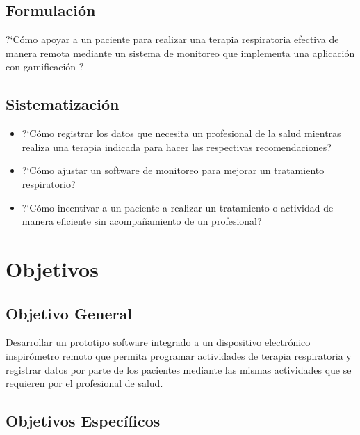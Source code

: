 \subsection{Formulaci\'on}

?`C\'omo apoyar a un paciente para realizar una terapia respiratoria efectiva de manera remota mediante un sistema de monitoreo que implementa una aplicaci\'on con gamificaci\'on ?

\subsection{Sistematizaci\'on}

\begin{itemize}

\item ?`C\'omo registrar los datos que necesita un profesional de la salud mientras realiza una terapia indicada para hacer las respectivas recomendaciones?

\item ?`C\'omo ajustar un software de monitoreo para mejorar un tratamiento respiratorio? 

\item ?`C\'omo incentivar a un paciente a realizar un tratamiento o actividad de manera eficiente sin acompa\~{n}amiento de un profesional? 

\end{itemize}

\section{Objetivos}

\subsection{Objetivo General}

Desarrollar un prototipo software integrado a un dispositivo electr\'onico inspir\'ometro remoto que permita programar actividades de terapia respiratoria y registrar datos por parte de los pacientes mediante las mismas actividades que se requieren por el profesional de salud.

\subsection{Objetivos Espec\'ificos}

